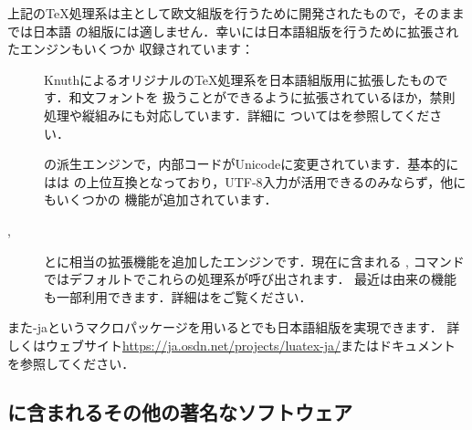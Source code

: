 \documentclass[uplatex,dvipdfmx,tombow]{jsarticle}
\begin{document}
%
\begin{janote}
上記の\TeX 処理系は主として欧文組版を行うために開発されたもので，そのままでは日本語
の組版には適しません．幸い\TL には日本語組版を行うために拡張されたエンジンもいくつか
収録されています：
%
\begin{description}
\item[\pTeX]
Knuthによるオリジナルの\TeX 処理系を日本語組版用に拡張したものです．和文フォントを
扱うことができるように拡張されているほか，禁則処理や縦組みにも対応しています．詳細に
ついてはを参照してください．

\item[\upTeX]
\pTeX の派生エンジンで，内部コードがUnicodeに変更されています．基本的には\upTeX は
\pTeX の上位互換となっており，UTF-8入力が活用できるのみならず，他にもいくつかの
機能が追加されています．

\item[\epTeX, \eupTeX]
\pTeX と\upTeX に\eTeX 相当の拡張機能を追加したエンジンです．現在\TL に含まれる
, コマンドではデフォルトでこれらの処理系が呼び出されます．
最近は\pdfTeX 由来の機能も一部利用できます．詳細はをご覧ください．
\end{description}
%
また\LuaTeX-jaというマクロパッケージを用いると\LuaTeX でも日本語組版を実現できます．
詳しくはウェブサイト\url{https://ja.osdn.net/projects/luatex-ja/}またはドキュメント
を参照してください．
\end{janote}

\subsection{\TL に含まれるその他の著名なソフトウェア}
\end{document}
